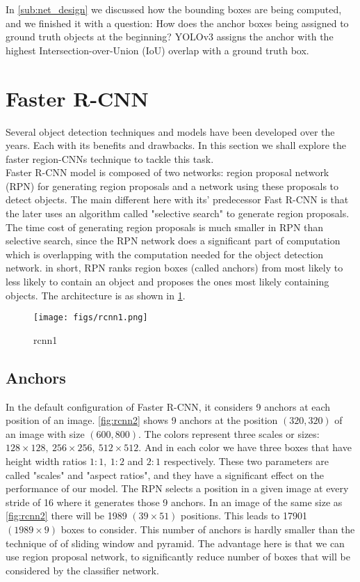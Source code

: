 In \cref{sub:net_design} we discussed how the bounding boxes are being computed, and we finished it with a question: How does the anchor boxes being
assigned to ground truth objects at the beginning? YOLOv3 assigns the anchor with the highest Intersection-over-Union (IoU) overlap with a ground
truth box.

\section{Faster R-CNN}
Several object detection techniques and models have been developed over the years. Each with its benefits and drawbacks. In this section we shall explore the faster region-CNNs technique to tackle this task. \\

Faster R-CNN model is composed of two networks: region proposal network (RPN) for generating region proposals and a network using these proposals to detect objects. The main different here with its' predecessor Fast R-CNN is that the later uses an algorithm called "selective search" to generate region proposals. The time cost of generating region proposals is much smaller in RPN than selective search, since the RPN network does a significant part of computation which is overlapping  with the computation needed for the  object detection network. in short, RPN ranks region boxes (called anchors) from most likely to less likely to contain an object and proposes the ones most likely containing objects. The architecture is as shown in  \cref{fig:rcnn1}.

\begin{figure}[H]
	\centering
	\texttt{[image: figs/rcnn1.png]}
	\caption{rcnn1}\label{fig:rcnn1}
\end{figure}

\subsection{Anchors}
In the default configuration of Faster R-CNN, it considers 9 anchors at each position of an image. \cref{fig:rcnn2} shows 9 anchors at the position $(320, 320)$ of an image with size $(600, 800)$. The colors represent three scales or sizes: $128 \times 128,\ 256 \times 256,\ 512 \times 512$. And in each color we have three boxes that have height width ratios $1:1,\ 1:2$ and $2:1$ respectively. These two parameters are called "scales" and "aspect ratios", and they have a significant effect on the performance of our model.
The RPN selects a position in a given image at every stride of 16 where it generates those 9 anchors. In an image of the same size as \cref{fig:rcnn2}  there will be 1989 $(39 \times 51)$ positions. This leads to 17901 $(1989 \times 9)$ boxes to consider. This number of anchors is hardly smaller than the technique of of sliding window and pyramid. The advantage here is that we can use region proposal network, to significantly reduce number of boxes that will be considered by the classifier network.

